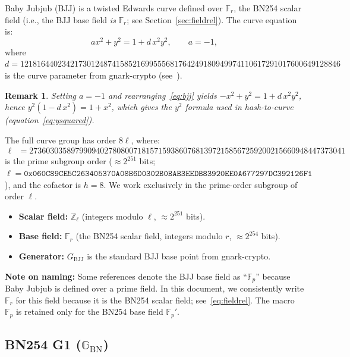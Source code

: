 \documentclass[11pt,a4paper]{article}
\newtheorem{remark}{Remark}[section]
\newcommand{\F}{\mathbb{F}}
\newcommand{\Z}{\mathbb{Z}}
\newcommand{\G}{\mathbb{G}}
\newcommand{\Gbn}{\G_{\mathrm{BN}}}
\newcommand{\Fr}{\F_r}
\newcommand{\Fl}{\Z_\ell}
\newcommand{\Fp}{\F_p}
\newcommand{\cofactor}{h}
\newcommand{\genbjj}{G_{\mathrm{BJJ}}}
\begin{document}
Baby Jubjub (BJJ) is a twisted Edwards curve defined over $\Fr$, the BN254
scalar field (i.e., the BJJ base field \emph{is} $\Fr$; see
Section~\ref{sec:fieldrel}). The curve equation is:
\begin{equation}
  \label{eq:bjj}
  a x^2 + y^2 = 1 + d\, x^2 y^2, \qquad a = -1,
\end{equation}
where $d = 12181644023421730124874158521699555681764249180949974110617291017600649128846$ is the curve parameter from gnark-crypto (see~\cite{lefkovits2017}).

\begin{remark}
  Setting $a = -1$ and rearranging~\eqref{eq:bjj} yields
  $-x^2 + y^2 = 1 + d\,x^2 y^2$, hence
  $y^2(1 - d\,x^2) = 1 + x^2$, which gives the $y^2$ formula used
  in hash-to-curve (equation~\eqref{eq:ysquared}).
\end{remark}

The full curve group has
order $8\ell$, where:
\begin{align}
  \ell &= 2736030358979909402780800718157159386076813972158567259200215660948447373041
  \label{eq:ell}
\end{align}
is the prime subgroup order ($\approx 2^{251}$ bits;
$\ell = \texttt{0x060C89CE5C263405370A08B6D0302B0BAB3EEDB83920EE0A677297DC392126F1}$),
and the cofactor is $\cofactor = 8$. We work exclusively in the prime-order
subgroup of order $\ell$.

\begin{itemize}[nosep]
  \item \textbf{Scalar field:} $\Fl$ (integers modulo $\ell$, $\approx 2^{251}$ bits).
  \item \textbf{Base field:} $\Fr$ (the BN254 scalar field, integers modulo $r$, $\approx 2^{254}$ bits).
  \item \textbf{Generator:} $\genbjj$ is the standard BJJ base point from gnark-crypto.
\end{itemize}

\noindent
\textbf{Note on naming:} Some references denote the BJJ base field as ``$\Fp$''
because Baby Jubjub is defined over a prime field. In this document, we
consistently write $\Fr$ for this field because it is the BN254 scalar field;
see~\eqref{eq:fieldrel}. The macro $\Fp$ is retained only for the BN254 base
field $\Fp'$.

\subsection{BN254 G1 ($\Gbn$)}
\label{sec:bn254}
\end{document}
